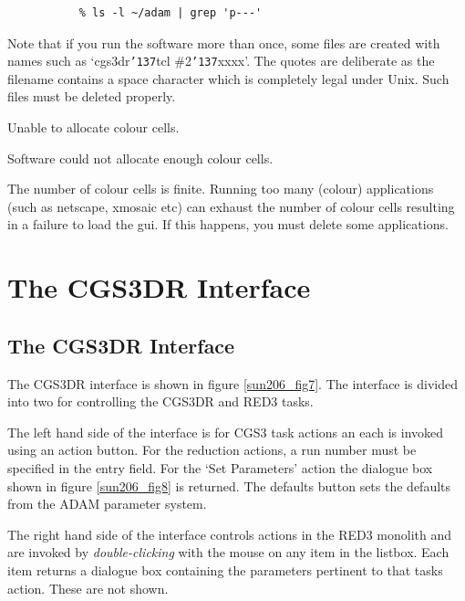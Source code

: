 \documentclass[a4paper]{book}
\newcommand{\stardocinitials}  {SUN}
\newcommand{\stardocnumber}    {206.1}
\newcommand{\stardocname}{\stardocinitials /\stardocnumber}
\renewcommand{\_}{{\tt\char'137}}
\begin{document}
\begin{description}
  \begin{verbatim}
           % ls -l ~/adam | grep 'p---'
  \end{verbatim}

  Note that if you run the software more than once, some files are created with names such as
  `cgs3dr\_tcl \#2\_xxxx'. The quotes are deliberate as the filename contains a space character
  which is completely legal under Unix. Such files must be deleted properly.

\item[] {\sf Unable to allocate colour cells.}

  Software could not allocate enough colour cells.

  The number of colour cells is finite. Running too many (colour) applications (such as
  netscape, xmosaic etc) can exhaust the number of colour cells resulting in a failure
  to load the {\sc gui}. If this happens, you must delete some applications.
\end{description}

\chapter{The CGS3DR Interface}
\markboth{CGS3DR Interface}{\stardocname}
\section{The CGS3DR Interface}
The CGS3DR interface is shown in figure \ref{sun206_fig7}.
The interface is divided into two for controlling the CGS3DR and RED3 tasks.

The left hand side of the interface is for CGS3 task actions an each is invoked using
an action button. For the reduction actions, a run number must be specified in the
entry field. For the `Set Parameters' action the dialogue box shown in figure \ref{sun206_fig8}
is returned. The defaults button sets the defaults from the ADAM parameter system.

The right hand side of the interface controls actions in the RED3 monolith and are
invoked by {\em double-clicking} with the mouse on any item in the
listbox. Each item returns a dialogue box containing the parameters pertinent to that
tasks action. These are not shown.
\end{document}
